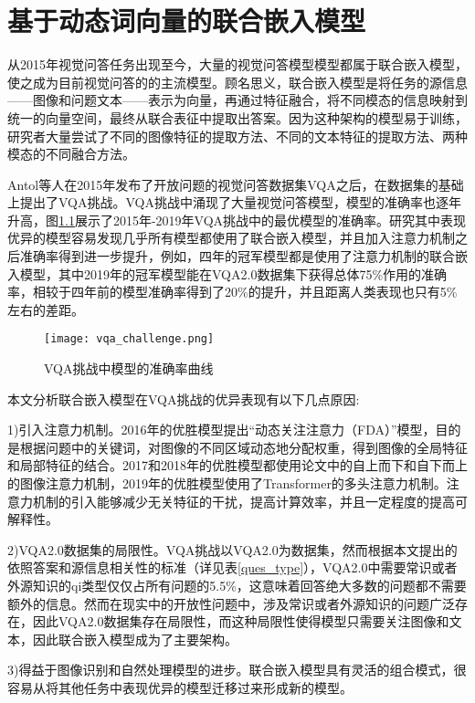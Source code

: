
\chapter{基于动态词向量的联合嵌入模型}
从2015年视觉问答任务出现至今，大量的视觉问答模型模型都属于联合嵌入模型，使之成为目前视觉问答的的主流模型。顾名思义，联合嵌入模型是将任务的源信息——图像和问题文本——表示为向量，再通过特征融合，将不同模态的信息映射到统一的向量空间，最终从联合表征中提取出答案。因为这种架构的模型易于训练，研究者大量尝试了不同的图像特征的提取方法、不同的文本特征的提取方法、两种模态的不同融合方法。

Antol等人在2015年发布了开放问题的视觉问答数据集VQA之后，在数据集的基础上提出了VQA挑战。VQA挑战中涌现了大量视觉问答模型，模型的准确率也逐年升高，图\ref{vqa_challenge}展示了2015年-2019年VQA挑战中的最优模型的准确率。研究其中表现优异的模型容易发现几乎所有模型都使用了联合嵌入模型，并且加入注意力机制之后准确率得到进一步提升，例如，四年的冠军模型都是使用了注意力机制的联合嵌入模型，其中2019年的冠军模型能在VQA2.0数据集下获得总体75\%作用的准确率，相较于四年前的模型准确率得到了20\%的提升，并且距离人类表现也只有5\%左右的差距。
\begin{figure}[H]
	\texttt{[image: vqa\_challenge.png]}
	\caption{VQA挑战中模型的准确率曲线}
	\label{vqa_challenge}
\end{figure}

本文分析联合嵌入模型在VQA挑战的优异表现有以下几点原因:

1)引入注意力机制。2016年的优胜模型提出“动态关注注意力（FDA）”模型，目的是根据问题中的关键词，对图像的不同区域动态地分配权重，得到图像的全局特征和局部特征的结合。2017和2018年的优胜模型都使用论文\cite{anderson2018bottom}中的自上而下和自下而上的图像注意力机制，2019年的优胜模型使用了Transformer的多头注意力机制。注意力机制的引入能够减少无关特征的干扰，提高计算效率，并且一定程度的提高可解释性。

2)VQA2.0数据集的局限性。VQA挑战以VQA2.0为数据集，然而根据本文提出的依照答案和源信息相关性的标准（详见表\ref{ques_type}），VQA2.0中需要常识或者外源知识的qi类型仅仅占所有问题的5.5\%，这意味着回答绝大多数的问题都不需要额外的信息。然而在现实中的开放性问题中，涉及常识或者外源知识的问题广泛存在，因此VQA2.0数据集存在局限性，而这种局限性使得模型只需要关注图像和文本，因此联合嵌入模型成为了主要架构。

3)得益于图像识别和自然处理模型的进步。联合嵌入模型具有灵活的组合模式，很容易从将其他任务中表现优异的模型迁移过来形成新的模型。



